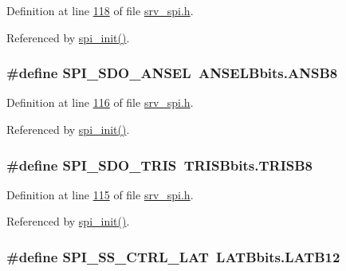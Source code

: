 Definition at line \hyperlink{a00013_source_l00118}{118} of file \hyperlink{a00013_source}{srv\+\_\+spi.\+h}.



Referenced by \hyperlink{a00032_source_l00030}{spi\+\_\+init()}.

\hypertarget{a00013_a11571727bdbc21b0bfb7c701599e759b}{
\subsubsection[{S\+P\+I\+\_\+\+S\+D\+O\+\_\+\+A\+N\+S\+E\+L}]{\setlength{\rightskip}{0pt plus 5cm}\#define S\+P\+I\+\_\+\+S\+D\+O\+\_\+\+A\+N\+S\+E\+L~A\+N\+S\+E\+L\+Bbits.\+A\+N\+S\+B8}}\label{a00013_a11571727bdbc21b0bfb7c701599e759b}


Definition at line \hyperlink{a00013_source_l00116}{116} of file \hyperlink{a00013_source}{srv\+\_\+spi.\+h}.



Referenced by \hyperlink{a00032_source_l00030}{spi\+\_\+init()}.

\hypertarget{a00013_aa171067a2f57d1555ab4449c78847c72}{
\subsubsection[{S\+P\+I\+\_\+\+S\+D\+O\+\_\+\+T\+R\+I\+S}]{\setlength{\rightskip}{0pt plus 5cm}\#define S\+P\+I\+\_\+\+S\+D\+O\+\_\+\+T\+R\+I\+S~T\+R\+I\+S\+Bbits.\+T\+R\+I\+S\+B8}}\label{a00013_aa171067a2f57d1555ab4449c78847c72}


Definition at line \hyperlink{a00013_source_l00115}{115} of file \hyperlink{a00013_source}{srv\+\_\+spi.\+h}.



Referenced by \hyperlink{a00032_source_l00030}{spi\+\_\+init()}.

\hypertarget{a00013_aa8b53e04161d178ebd9c01edf1584039}{
\subsubsection[{S\+P\+I\+\_\+\+S\+S\+\_\+\+C\+T\+R\+L\+\_\+\+L\+A\+T}]{\setlength{\rightskip}{0pt plus 5cm}\#define S\+P\+I\+\_\+\+S\+S\+\_\+\+C\+T\+R\+L\+\_\+\+L\+A\+T~L\+A\+T\+Bbits.\+L\+A\+T\+B12}}\label{a00013_aa8b53e04161d178ebd9c01edf1584039}



